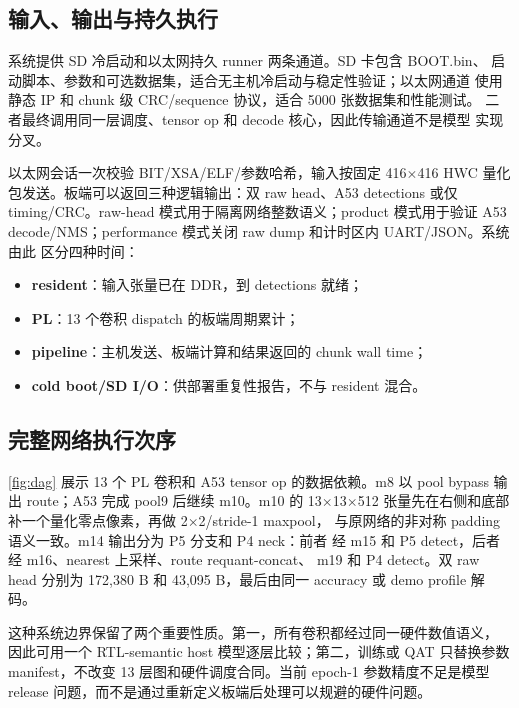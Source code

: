 \subsection{输入、输出与持久执行}

系统提供 SD 冷启动和以太网持久 runner 两条通道。SD 卡包含 BOOT.bin、
启动脚本、参数和可选数据集，适合无主机冷启动与稳定性验证；以太网通道
使用静态 IP 和 chunk 级 CRC/sequence 协议，适合 5000 张数据集和性能测试。
二者最终调用同一层调度、tensor op 和 decode 核心，因此传输通道不是模型
实现分叉。

以太网会话一次校验 BIT/XSA/ELF/参数哈希，输入按固定 416$\times$416 HWC
量化包发送。板端可以返回三种逻辑输出：双 raw head、A53 detections 或仅
timing/CRC。raw-head 模式用于隔离网络整数语义；product 模式用于验证 A53
decode/NMS；performance 模式关闭 raw dump 和计时区内 UART/JSON。系统由此
区分四种时间：
\begin{itemize}[leftmargin=1.8em]
  \item \textbf{resident}：输入张量已在 DDR，到 detections 就绪；
  \item \textbf{PL}：13 个卷积 dispatch 的板端周期累计；
  \item \textbf{pipeline}：主机发送、板端计算和结果返回的 chunk wall time；
  \item \textbf{cold boot/SD I/O}：供部署重复性报告，不与 resident 混合。
\end{itemize}

\subsection{完整网络执行次序}

\cref{fig:dag} 展示 13 个 PL 卷积和 A53 tensor op 的数据依赖。m8 以 pool
bypass 输出 route；A53 完成 pool9 后继续 m10。m10 的 13$\times$13$\times$512
张量先在右侧和底部补一个量化零点像素，再做 2$\times$2/stride-1 maxpool，
与原网络的非对称 padding 语义一致。m14 输出分为 P5 分支和 P4 neck：前者
经 m15 和 P5 detect，后者经 m16、nearest 上采样、route requant-concat、
m19 和 P4 detect。双 raw head 分别为 172,380 B 和 43,095 B，最后由同一
accuracy 或 demo profile 解码。



这种系统边界保留了两个重要性质。第一，所有卷积都经过同一硬件数值语义，
因此可用一个 RTL-semantic host 模型逐层比较；第二，训练或 QAT 只替换参数
manifest，不改变 13 层图和硬件调度合同。当前 epoch-1 参数精度不足是模型
release 问题，而不是通过重新定义板端后处理可以规避的硬件问题。
